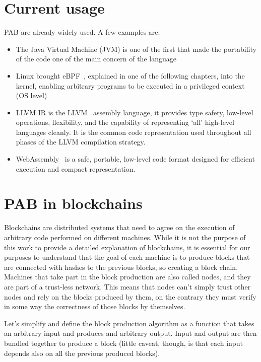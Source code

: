 \section{Current usage}

PAB are already widely used. A few examples are:

\begin{itemize}
  \item
        The Java Virtual Machine (JVM) is one of the first that made the portability of the code one of the main concern of the language
  \item
        Linux brought eBPF~\cite{ebpf}, explained in one of the following chapters, into the kernel, enabling arbitrary programs to be executed in a privileged context (OS level)
  \item
        LLVM IR is the LLVM~\cite{LLVM} assembly language, it provides type safety, low-level operations, flexibility, and the capability of representing ‘all’ high-level languages cleanly. It is the common code representation used throughout all phases of the LLVM compilation strategy.
  \item
        WebAssembly~\cite{wasm-core-spec} is a safe, portable, low-level code format designed for efficient execution and compact representation.
\end{itemize}

\section{PAB in blockchains}

Blockchains are distributed systems that need to agree on the execution of arbitrary code performed on different machines. While it is not the purpose of this work to provide a detailed explanation of blockchains, it is essential for our purposes to understand that the goal of each machine is to produce blocks that are connected with hashes to the previous blocks, so creating a block chain. Machines that take part in the block production are also called nodes, and they are part of a trust-less network. This means that nodes can't simply trust other nodes and rely on the blocks produced by them, on the contrary they must verify in some way the correctness of those blocks by themselves.

Let's simplify and define the block production algorithm as a function that takes an arbitrary input and produces and arbitrary output. Input and output are then bundled together to produce a block (little caveat, though, is that each input depends also on all the previous produced blocks).

